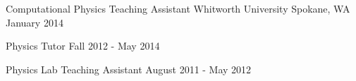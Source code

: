 \begin{cventries}
  \cventry
    {Computational Physics Teaching Assistant} %
    {Whitworth University}
    {Spokane, WA} %
    {January 2014} %
    {
    }

\vspace{-0.5cm}
 \cventry
    {Physics Tutor}
    {}
    {}
    {Fall 2012 - May 2014}
    {
    }

\vspace{-0.5cm}
 \cventry
    {Physics Lab Teaching Assistant}
    {}
    {}
    {August 2011 - May 2012}
    {
    }


\end{cventries}
